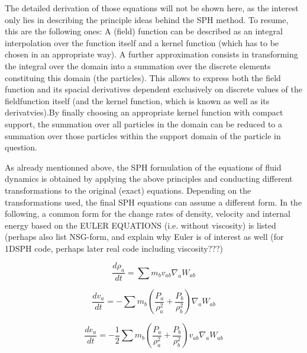 \documentclass{report}
\begin{document}
The detailed derivation of those equations will not be shown here, as the
interest  only lies in describing the principle ideas behind the SPH
method. To resume, this are the following ones: A (field) function can be
described as an integral interpolation over the function itself and a kernel
function (which has to be chosen in an appropriate way). A further
approximation consists in transforming the integral over the domain into a
summation over the discrete elements constituing this domain (the particles). This allows to express both
the field function and its spacial derivatives dependent exclusively on discrete values
of the fieldfunction itself (and the kernel function, which is known as well as
its derivatvies).By finally choosing an appropriate kernel function with
compact support, the summation over all particles in the domain can be reduced
to a summation over those particles within the support domain of the particle
in question.

As already mentionned above, the SPH formulation of the equations of fluid
dynamics is obtained by applying the above principles and conducting different
transformations to the original (exact) equations. Depending on the
transformations used, the final SPH equations can assume a different form. In
the following, a common form for the change rates of density, velocity and
internal energy based on the EULER EQUATIONS (i.e. without viscosity) is
listed\cite{Monaghan2005}\cite{Liu2003} (perhaps also list NSG-form, and
explain why Euler is of interest as well (for 1DSPH code, perhaps later real
code including viscosity???)

\begin{equation}
\label{eq:DCR_Euler}
\frac{d\rho _a}{\mathit{dt}}=\sum{m_{b}v_{\mathit{ab}}\nabla _{a}W_{\mathit{ab}}}
\end{equation}

\begin{equation}
\label{eq:VCR_Euler}
\frac{dv_{a}}{\mathit{dt}}=-\sum {m_{b}\left(\frac{P_{a}}{\rho_{a}^{2}}+\frac{P_{b}}{\rho _{b}^{2}}\right)\nabla_{a}W_{ab}}
\end{equation}


\begin{equation}
\label{eq:ECR_Euler}
\frac{de_{a}}{\mathit{dt}}=-\mathit{}\frac{1}{2}\sum{m_{b}\left(\frac{P_{a}}{\rho _{a}^{2}}+\frac{P_{b}}{\rho _{b}^{2}}\right)v_{\mathit{ab}}\nabla _{a}W_{\mathit{ab}}}
\end{equation}
\end{document}
